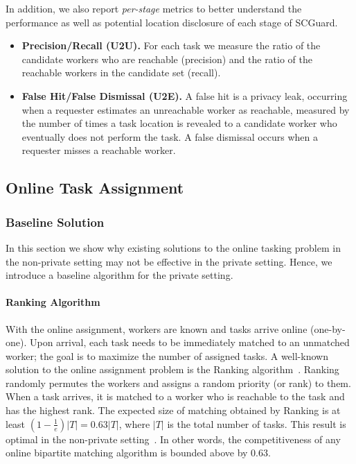 \documentclass{USC-Thesis}
\renewcommand\bf\bfseries  %
\numberwithin{equation}{chapter}
\begin{document}
In addition, we also report \emph{per-stage} metrics to better understand the performance as well as potential location disclosure of each stage of SCGuard.
\begin{itemize}
\item
{\bf Precision/Recall (U2U).} For each task we measure the ratio of the candidate workers who are reachable (precision) and the ratio of the reachable workers in the candidate set (recall).
\item
{\bf False Hit/False Dismissal (U2E).} A false hit is a privacy leak, occurring when a requester estimates an unreachable worker as reachable, measured by the number of times a task location is revealed to a candidate worker who eventually does not perform the task.
A false dismissal occurs when a requester misses a reachable worker.
\end{itemize}

\subsection{Online Task Assignment}
\label{sec:ota}
\subsubsection{Baseline Solution}
In this section we show why existing solutions to the online tasking problem in the non-private setting may not be effective in the private setting. Hence, we introduce a baseline algorithm for the private setting.

\paragraph{Ranking Algorithm}
\label{sec:non-private}
With the online assignment, workers are known and tasks arrive online (one-by-one). Upon arrival, each task needs to be immediately matched to an unmatched worker; the goal is to maximize the number of assigned tasks. A well-known solution to the online assignment problem is the Ranking algorithm~\cite{karp1990optimal}. Ranking randomly permutes the workers and assigns a random priority (or rank) to them. When a task arrives, it is matched to a worker who is reachable to the task and has the highest rank. The expected size of matching obtained by Ranking is at least $(1-\frac{1}{e})|T|=0.63|T|$, where $|T|$ is the total number of tasks. This result is optimal in the non-private setting~\cite{karp1990optimal}. In other words, the competitiveness of any online bipartite matching algorithm is bounded above by 0.63.
\end{document}
